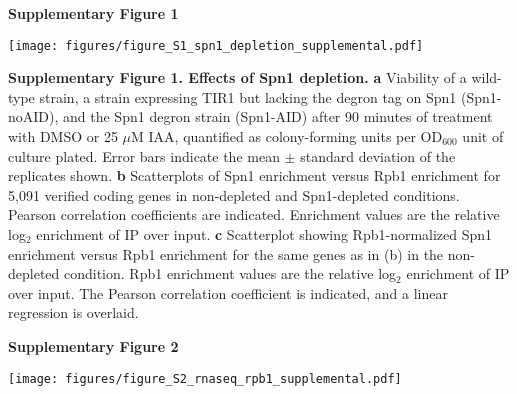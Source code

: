 \documentclass[8pt]{extarticle}
\begin{document}
\newpage

\textbf{\large Supplementary Figure 1}

{\texttt{[image: figures/figure\_S1\_spn1\_depletion\_supplemental.pdf]}\par}

\vspace{2em}
\textbf{Supplementary Figure 1. Effects of Spn1 depletion.}
\textbf{a} Viability of a wild-type strain, a strain expressing TIR1 but lacking the degron tag on Spn1 (Spn1-noAID), and the Spn1 degron strain (Spn1-AID) after 90 minutes of treatment with DMSO or 25 $\mu$M IAA, quantified as colony-forming units per OD$_{600}$ unit of culture plated.
Error bars indicate the mean $\pm$ standard deviation of the replicates shown.
\textbf{b} Scatterplots of Spn1 enrichment versus Rpb1 enrichment for 5,091 verified coding genes in non-depleted and Spn1-depleted conditions.
Pearson correlation coefficients are indicated.
Enrichment values are the relative log$_2$ enrichment of IP over input.
\textbf{c} Scatterplot showing Rpb1-normalized Spn1 enrichment versus Rpb1 enrichment for the same genes as in (b) in the non-depleted condition.
Rpb1 enrichment values are the relative log$_2$ enrichment of IP over input.
The Pearson correlation coefficient is indicated, and a linear regression is overlaid.

\newpage

\textbf{\large Supplementary Figure 2}

{\texttt{[image: figures/figure\_S2\_rnaseq\_rpb1\_supplemental.pdf]}\par}
\end{document}
